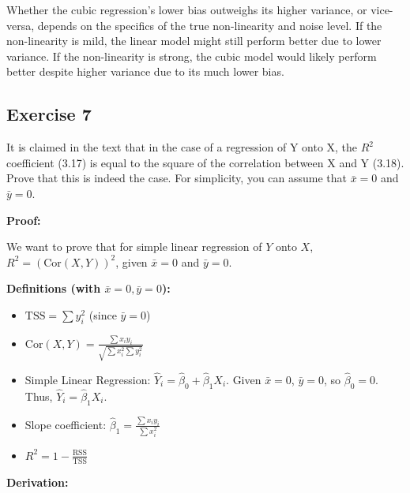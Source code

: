 \documentclass[
]{article}
\providecommand{\tightlist}{%
  \setlength{\itemsep}{0pt}\setlength{\parskip}{0pt}}
\begin{document}
Whether the cubic regression's lower bias outweighs its higher variance,
or vice-versa, depends on the specifics of the true non-linearity and
noise level. If the non-linearity is mild, the linear model might still
perform better due to lower variance. If the non-linearity is strong,
the cubic model would likely perform better despite higher variance due
to its much lower bias.

\subsection{Exercise 7}\label{exercise-7}

It is claimed in the text that in the case of a regression of Y onto X,
the \(R^2\) coefficient (3.17) is equal to the square of the correlation
between X and Y (3.18). Prove that this is indeed the case. For
simplicity, you can assume that \(\bar{x} = 0\) and \(\bar{y} = 0\).

\textbf{Proof:}

We want to prove that for simple linear regression of \(Y\) onto \(X\),
\(R^2 = (\text{Cor}(X, Y))^2\), given \(\bar{x} = 0\) and
\(\bar{y} = 0\).

\textbf{Definitions (with \(\bar{x} = 0, \bar{y} = 0\)):}

\begin{itemize}
\tightlist
\item
  \(\text{TSS} = \sum y_i^2\) (since \(\bar{y} = 0\))
\item
  \(\text{Cor}(X,Y) = \frac{\sum x_i y_i}{\sqrt{\sum x_i^2 \sum y_i^2}}\)
\item
  Simple Linear Regression:
  \(\hat{Y}_i = \hat{\beta}_0 + \hat{\beta}_1 X_i\). Given
  \(\bar{x}=0\), \(\bar{y}=0\), so \(\hat{\beta}_0 = 0\). Thus,
  \(\hat{Y}_i = \hat{\beta}_1 X_i\).
\item
  Slope coefficient: \(\hat{\beta}_1 = \frac{\sum x_i y_i}{\sum x_i^2}\)
\item
  \(R^2 = 1 - \frac{\text{RSS}}{\text{TSS}}\)
\end{itemize}

\textbf{Derivation:}
\end{document}
